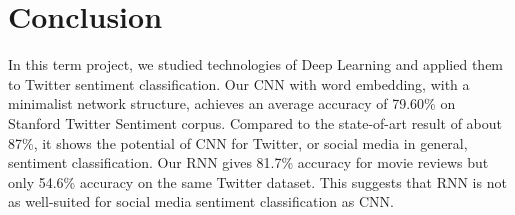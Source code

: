 \section{Conclusion}\label{sec.conclusion}

In this term project, we studied technologies of Deep Learning and applied them to Twitter sentiment classification. Our CNN with word embedding, with a minimalist network structure, achieves an average accuracy of 79.60\% on Stanford Twitter Sentiment corpus. Compared to the state-of-art result of about 87\%, it shows the potential of CNN for Twitter, or social media in general, sentiment classification. Our RNN gives 81.7\% accuracy for movie reviews but only 54.6\% accuracy on the same Twitter dataset. This suggests that RNN is not as well-suited for social media sentiment classification as CNN.
